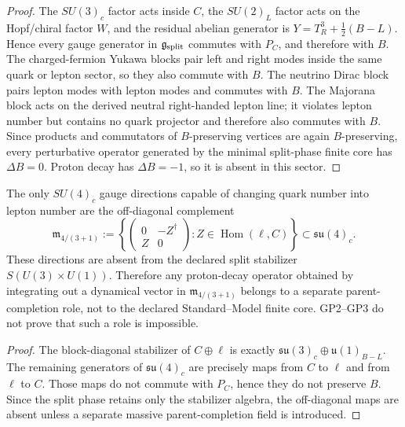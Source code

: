 \documentclass[12pt,a4paper]{article}
\begin{document}
\begin{proof}
The \(SU(3)_c\) factor acts inside \(C\), the \(SU(2)_L\) factor acts on the
Hopf/chiral factor \(W\), and the residual abelian generator is
\(Y=T_R^3+\frac12(B-L)\).  Hence every gauge generator in
\(\mathfrak g_{\rm split}\) commutes with \(P_C\), and therefore with \(B\).
The charged-fermion Yukawa blocks pair left and right modes inside the same
quark or lepton sector, so they also commute with \(B\).  The neutrino Dirac
block pairs lepton modes with lepton modes and commutes with \(B\).  The
Majorana block acts on the derived neutral right-handed lepton line; it violates
lepton number but contains no quark projector and therefore also commutes with
\(B\).  Since products and commutators of \(B\)-preserving vertices are again
\(B\)-preserving, every perturbative operator generated by the minimal
split-phase finite core has \(\Delta B=0\).  Proton decay has \(\Delta B=-1\),
so it is absent in this sector.
\end{proof}

\begin{corollary}
\label{p5:cor:offdiagonal-parent-exchange-nonminimal}
The only \(SU(4)_c\) gauge directions capable of changing quark number into
lepton number are the off-diagonal complement
\[
\mathfrak m_{4/(3+1)}
:=
\left\{
\begin{pmatrix}
0&-Z^\dagger\\ Z&0
\end{pmatrix}
:Z\in\operatorname{Hom}(\ell,C)
\right\}
\subset
\mathfrak{su}(4)_c .
\]
These directions are absent from the declared split stabilizer
\(S(U(3)\times U(1))\).  Therefore any proton-decay operator obtained by
integrating out a dynamical vector in \(\mathfrak m_{4/(3+1)}\) belongs to a
separate parent-completion role, not to the declared Standard--Model finite
core.  GP2--GP3 do not prove that such a role is impossible.
\end{corollary}

\begin{proof}
The block-diagonal stabilizer of \(C\oplus\ell\) is exactly
\(\mathfrak{su}(3)_c\oplus\mathfrak u(1)_{B-L}\).  The remaining generators of
\(\mathfrak{su}(4)_c\) are precisely maps from \(C\) to \(\ell\) and from
\(\ell\) to \(C\).  Those maps do not commute with \(P_C\), hence they do not
preserve \(B\).  Since the split phase retains only the stabilizer algebra, the
off-diagonal maps are absent unless a separate massive parent-completion field
is introduced.
\end{proof}
\end{document}
